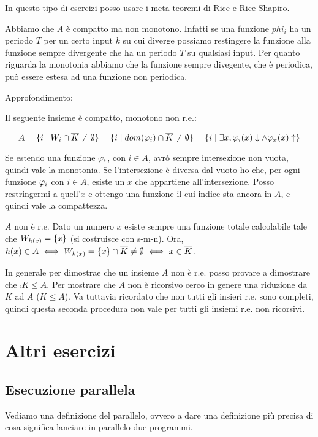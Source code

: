 In questo tipo di esercizi posso usare i meta-teoremi di Rice e Rice-Shapiro.

Abbiamo che $A$ è compatto ma non monotono. Infatti se una funzione $phi_{i}$ ha un periodo $T$ per
un certo input $k$ su cui diverge possiamo restingere la funzione alla funzione sempre divergente
che ha un periodo $T$ su qualsiasi input. Per quanto riguarda la monotonia abbiamo che la funzione
sempre divegente, che è periodica, può essere estesa ad una funzione non periodica.

Approfondimento:

Il seguente insieme è compatto, monotono non r.e.:

\begin{equation*}
    A = \{ i \mid W_{i} \cap \overline{K} \not= \emptyset\} = \{ i \mid dom(\varphi_{i}) \cap \overline{K}
    \not= \emptyset \} = \{ i \mid \exists x, \varphi_{i}(x) \downarrow \land \varphi_{x}(x) \uparrow\}
\end{equation*}

Se estendo una funzione $\varphi_{i}$, con $i \in A$, avrò sempre intersezione non vuota, quindi vale la
monotonia. Se l'intersezione è diversa dal vuoto ho che, per ogni funzione $\varphi_{i}$ con $i \in A$,
esiste un $x$ che appartiene all'intersezione. Posso restringermi a quell'$x$ e ottengo una funzione
il cui indice sta ancora in $A$, e quindi vale la compattezza.

$A$ non è r.e. Dato un numero $x$ esiste sempre una funzione totale calcolabile tale che $W_{h(x)}
= \{x\}$ (si costruisce con s-m-n). Ora, $h(x) \in A \iff W_{h(x)} = \{x\} \cap \overline{K} \not=
\emptyset \iff x \in \overline{K}$.

In generale per dimostrae che un insieme $A$ non è r.e. posso provare a dimostrare che $\comp{K}
\leq A$. Per mostrare che $A$ non è ricorsivo cerco in genere una riduzione da $K$ ad $A$ ($K \leq
A$). Va tuttavia ricordato che non tutti gli insieri r.e. sono completi, quindi questa seconda
procedura non vale per tutti gli insiemi r.e. non ricorsivi.

\section{Altri esercizi}

\subsection{Esecuzione parallela}

Vediamo una definizione del parallelo, ovvero a dare una definizione più precisa di cosa significa
lanciare in parallelo due programmi.

